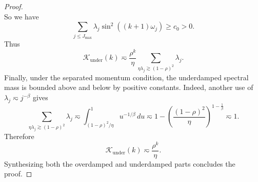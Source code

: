\begin{proof}
\[\]
So we have
\[
    \sum_{j \le J_{\max}} \lambda_j \sin^2((k+1)\omega_j) \ge c_0 > 0.
\]
Thus
\begin{equation*}
    \mathcal K_{\mathrm{under}}(k)
    \eqsim
    \frac{\rho^k}{\eta}
    \sum_{\eta\lambda_j\gtrsim(1-\rho)^2}\lambda_j .
\end{equation*}
Finally, under the separated momentum condition, the underdamped spectral mass is bounded above and below by positive constants. Indeed, another use of $\lambda_j\eqsim j^{-\beta}$ gives
\[
    \sum_{\eta\lambda_j\gtrsim(1-\rho)^2}\lambda_j
    \eqsim
    \int_{(1-\rho)^2/\eta}^{1}u^{-1/\beta}\,du
    \eqsim
    1-
    \left(\frac{(1-\rho)^2}{\eta}\right)^{1-\frac1\beta}
    \eqsim 1.
\]
Therefore
\begin{equation*}
    \mathcal K_{\mathrm{under}}(k)
    \eqsim
    \frac{\rho^k}{\eta}.
\end{equation*}
Synthesizing both the overdamped and underdamped parts concludes the proof.
\end{proof}


